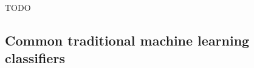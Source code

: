 


TODO


\subsection{Common traditional machine learning classifiers}
\label{subsec:processing_signals_ml_and_dl_ml_classifiers}

